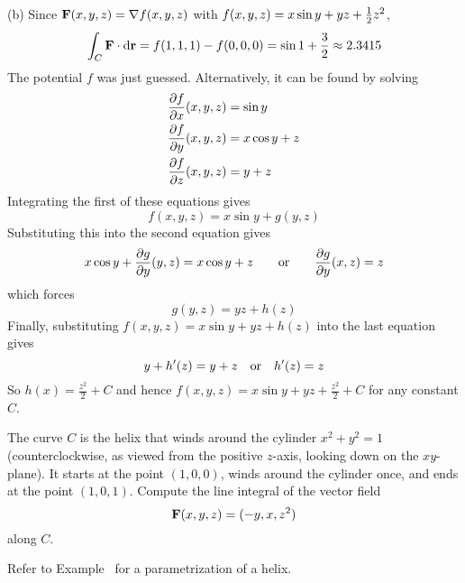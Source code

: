 \begin{solution}
(b)
Since $\mathbf{F}(x,y,z)=\nabla f(x,y,z)$ with $f(x,y,z)=x\sin y+yz+\tfrac{1}{2} z^2$,
\begin{equation*}
\int_C \mathbf{F}\cdot \mathrm{d}\mathbf{r}=f(1,1,1)-f(0,0,0)
=\sin 1+\frac{3}{2} \approx 2.3415
\end{equation*}
The potential $f$ was just guessed. Alternatively, it can be found 
by solving
\begin{align*}
\pdiff{f}{x}(x,y,z) 
            &= \sin y \\
\pdiff{f}{y}(x,y,z) &= x\cos y+z \\
\pdiff{f}{z}(x,y,z) &= y+z
\end{align*}
Integrating the first of these equations gives
\begin{equation*}
f(x,y,z) = x\sin y +g(y,z)
\end{equation*}
Substituting this into the second equation gives 
\begin{equation*}
x\cos y+\frac{\partial g}{\partial y}(y,z) = x\cos y+z\qquad\hbox{or}\qquad
\frac{\partial g}{\partial y}(x,z)=z
\end{equation*}
which forces
\begin{equation*}
g(y,z) =  yz + h(z)
\end{equation*}
Finally, substituting $f(x,y,z) = x\sin y +yz + h(z)$
into the last equation gives
\begin{equation*}
y + h'(z)
=y+z \quad\hbox{or}\quad
h'(z) = z
\end{equation*}
So $h(x) = \frac{z^2}{2}+C$ and hence 
$f(x,y,z) = x\sin y + yz + \frac{z^2}{2}+C$  for any constant $C$.

\end{solution}

\begin{question}[M317 2008D] %
The curve $C$ is the helix that winds around the cylinder $x^2 + y^2 = 1$ 
(counterclockwise, as viewed from the positive $z$-axis, looking 
down on the $xy$-plane). It starts at the point $(1, 0, 0)$, winds 
around the cylinder once, and ends at the point $(1, 0, 1)$.
Compute the line integral of the vector field 
\begin{equation*}
\mathbf{F}(x, y, z) = (-y, x, z^2)
\end{equation*}
along $C$.
\end{question}

\begin{hint} 
Refer to Example~ for a parametrization of a helix.
\end{hint}

